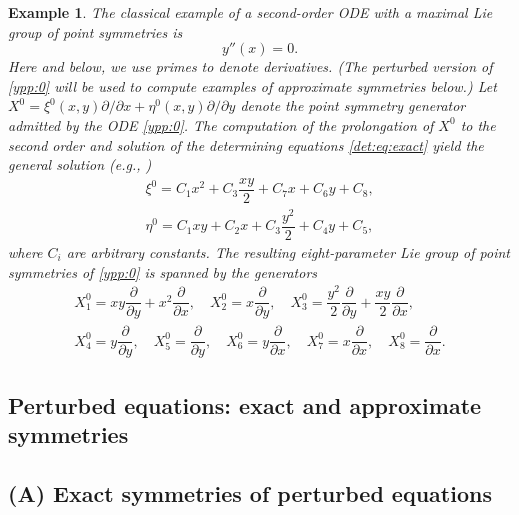 \documentclass[11pt,letter,subeqn]{article}
\def\beq{\begin{equation}}
\def\eeq{\end{equation}}
\def\barr{\begin{array}{ll}}
\def\earr{\end{array}}
\newtheorem{example}{Example}[section]
\begin{document}
\medskip\begin{example}\label{Example A-unperturbed}
The classical example of a second-order ODE with a maximal Lie group of point symmetries is
\begin{equation}\label{ypp:0}
y''(x)=0.
\end{equation}
Here and below, we use primes to denote derivatives. (The perturbed version of \eqref{ypp:0} will be used to compute examples of approximate symmetries below.) Let $X^0=\xi^0(x,y){\partial}/{\partial x}+\eta^0(x,y) {\partial}/{\partial y}$
denote the point symmetry generator admitted by the ODE \eqref{ypp:0}. The computation of the prolongation of $X^0$ to the second order and solution of the determining equations \eqref{det:eq:exact} yield the general solution (e.g., \cite{olver2000applications})
\beq\label{symm:Ypp0}
\barr
  \xi^0 = C_1x^2+C_3\dfrac{xy}{2}+C_7x+C_6y+C_8,\\
  \eta^0 = C_1xy+C_2 x+C_3\dfrac{y^2}{2}+C_4y+C_5,
\earr
\eeq
where $C_i$ are arbitrary constants. The resulting eight-parameter Lie group of point symmetries of \eqref{ypp:0} is spanned by the generators
\beq\label{symm:Ypp0:generators}
\barr
  X_1^0 = xy\dfrac{\partial}{\partial y}+ x^2\dfrac{\partial}{\partial x},\quad X_2^0=x\dfrac{\partial}{\partial y},\quad X_3^0= \dfrac{y^2}{2}\dfrac{\partial}{\partial
  y}+\dfrac{xy}{2}\dfrac{\partial}{\partial x},  \\[2ex]
  X_4^0 = y\dfrac{\partial}{\partial y},\quad X_5^0=\dfrac{\partial}{\partial y},\quad X_6^0= y\dfrac{\partial}{\partial x},\quad X_7^0= x\dfrac{\partial}{\partial x},\quad
  X_8^0= \dfrac{\partial}{\partial x}.
\earr
\eeq
\end{example}


\subsection{Perturbed equations: exact and approximate symmetries}

\subsection*{\textbf{(A)} Exact symmetries of perturbed equations}
\end{document}
